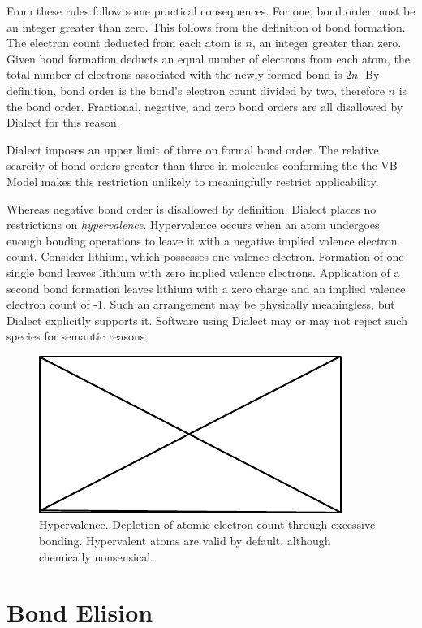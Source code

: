 \documentclass{article}
\begin{document}
From these rules follow some practical consequences. For one, bond order must be an integer greater than zero. This follows from the definition of bond formation. The electron count deducted from each atom is $n$, an integer greater than zero. Given bond formation deducts an equal number of electrons from each atom, the total number of electrons associated with the newly-formed bond is $2n$. By definition, bond order is the bond's electron count divided by two, therefore $n$ is the bond order. Fractional, negative, and zero bond orders are all disallowed by Dialect for this reason.

Dialect imposes an upper limit of three on formal bond order. The relative scarcity of bond orders greater than three in molecules conforming the the VB Model makes this restriction unlikely to meaningfully restrict applicability.

Whereas negative bond order is disallowed by definition, Dialect places no restrictions on \textit{hypervalence}. Hypervalence occurs when an atom undergoes enough bonding operations to leave it with a negative implied valence electron count. Consider lithium, which possesses one valence electron. Formation of one single bond leaves lithium with zero implied valence electrons. Application of a second bond formation leaves lithium with a zero charge and an implied valence electron count of -1. Such an arrangement may be physically meaningless, but Dialect explicitly supports it. Software using Dialect may or may not reject such species for semantic reasons.

\begin{figure}
    \centering
    \includegraphics{filler}
    \caption{Hypervalence. Depletion of atomic electron count through excessive bonding. Hypervalent atoms are valid by default, although chemically nonsensical.}
    \label{fig:hypervalence}
\end{figure}

\section*{Bond Elision}
\end{document}
